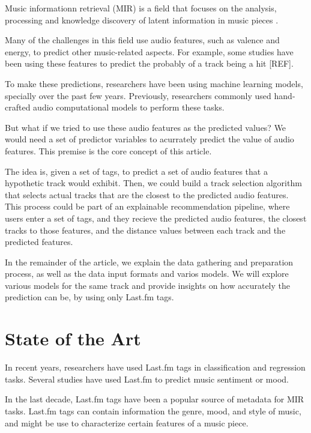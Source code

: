\documentclass[sn-mathphys]{sn-jnl}%
\theoremstyle{thmstyleone}%
\theoremstyle{thmstyletwo}%
\theoremstyle{thmstylethree}%
\begin{document}
Music informationn retrieval (MIR) is a field that focuses on the analysis,
processing and knowledge discovery of latent information in music pieces \cite{ramirez2020machine}.

Many of the challenges in this field use audio features, such as valence and energy, to predict other music-related aspects.
For example, some studies have been using these features to predict the probably of a track being a hit [REF].

To make these predictions, researchers have been using machine learning models, specially over the past few years.
Previously, researchers commonly used hand-crafted audio computational models to perform these tasks.

But what if we tried to use these audio features as the predicted values? We would need a set of predictor variables to
acurrately predict the value of audio features.
This premise is the core concept of this article.

The idea is, given a set of tags, to predict a set of audio features that a hypothetic track would exhibit.
Then, we could build a track selection algorithm that selects actual tracks that are the closest to the predicted audio features.
This process could be part of an explainable recommendation pipeline, where users enter a set of tags, and they recieve the predicted audio features, the closest tracks to those features, and the distance values between each track and the predicted features.

In the remainder of the article, we explain the data gathering and preparation process, as well as the data input formats and varios models.
We will explore various models for the same track and provide insights on how accurately the prediction can be, by using only Last.fm tags.

\section{State of the Art}

In recent years, researchers have used Last.fm tags in classification and regression tasks.
Several studies have used Last.fm to predict music sentiment or mood.



In the last decade, Last.fm tags have been a popular source of metadata for MIR tasks.
Last.fm tags can contain information the genre, mood, and style of music,
and might be use to characterize certain features of a music piece.
\end{document}
